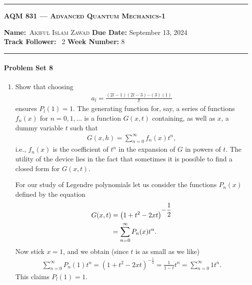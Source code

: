 \allowdisplaybreaks
\begin{center}
	\hrule
	\vspace{.4cm}
	\Large\scshape\textbf{AQM 831 --- Advanced Quantum Mechanics-1}
\end{center}
{\textbf{Name:}\ \textsc{Akiful Islam Zawad} \hspace{\hfill} \textbf{Due Date:} September 13, 2024\\[5pt]
{ \textbf{Track Follower:}} \ 2 \hspace{\hfill} \textbf{Week Number:} 8 \\
	\hrule}
\paragraph*{Problem Set 8}
\begin{enumerate}
    \item Show that choosing 
    \begin{align}
        a_l = \frac{(2l-1)(2l-3)\cdots(3)(1)}{l!}
    \end{align}
    ensures $P_l(1) = 1$.
    \bigskip\bigskip\hline\hline\bigskip
    The generating function for, say, a series of functions $f_n(x)$ for $n=0,1,\ldots$ is a function $G(x,t)$ containing, as well as $x$, a dummy variable $t$ such that
    \begin{align*}
        G(x,h)=\sum_{n=0}^\infty f_n(x) t^n,
    \end{align*}
    i.e., $f_n(x)$ is the coefficient of $t^n$ in the expansion of $G$ in powers of $t$. The utility of the device lies in the fact that sometimes it is possible to find a closed form for $G(x,t)$.

    For our study of Legendre polynomials let us consider the functions $P_n(x)$ defined by the equation
    \begin{align}
        G(x,t)&=\left(1+t^2-2xt\right)^{\displaystyle-\frac{1}{2}}\notag\\
        &=\sum_{n=0}^\infty P_n(x)t^n.\label{eq:generating-eqn-legendre}
    \end{align}
    Now stick $x=1$, and we obtain (since $t$ is as small as we like)
    \begin{align}
        \sum_{n=0}^{\infty} P_n(1) t^n = \left(1+t^2-2xt\right)^{\displaystyle-\frac{1}{2}} = \frac{1}{1-t}t^n = \sum_{n=0}^{\infty} 1t^n.
    \end{align}
    This claims $P_l(1)=1$.
    

\end{enumerate}
